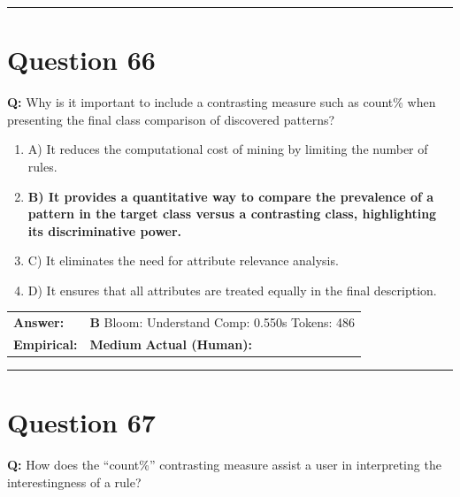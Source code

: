 \documentclass[9pt]{article}
\begin{document}
\vspace{0.2cm}
\rule{\textwidth}{0.4pt}
\vspace{0.2cm}


\section*{Question 66}

\textbf{Q:} Why is it important to include a contrasting measure such as count\% when presenting the final class comparison of discovered patterns?

\begin{enumerate}[label=\textbf{\alph{*})}, nosep]
    \item A) It reduces the computational cost of mining by limiting the number of rules.
    \item \textbf{B) It provides a quantitative way to compare the prevalence of a pattern in the target class versus a contrasting class, highlighting its discriminative power.} %
    \item C) It eliminates the need for attribute relevance analysis.
    \item D) It ensures that all attributes are treated equally in the final description.

\end{enumerate}

\begin{tabular}{@{}l p{10.5cm}@{}}
\textbf{Answer:} & \textbf{B} \hspace{1em} Bloom: Understand \hspace{1em} Comp: 0.550s \hspace{1em} Tokens: 486 \\
\textbf{Empirical:} & \textbf{Medium} \hspace{1em} \textbf{Actual (Human):} \underline{\hspace{5cm}}
\end{tabular}

\vspace{0.2cm}
\rule{\textwidth}{0.4pt}
\vspace{0.2cm}


\section*{Question 67}

\textbf{Q:} How does the “count\%” contrasting measure assist a user in interpreting the interestingness of a rule?
\end{document}
